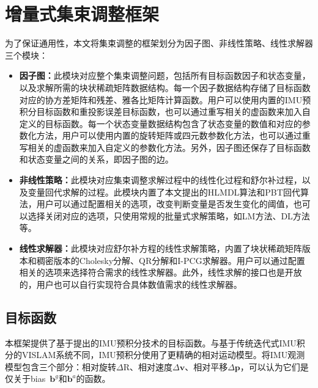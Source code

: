 \section{增量式集束调整框架}\label{sec:framework}

为了保证通用性，本文将集束调整的框架划分为因子图、非线性策略、线性求解器三个模块：
\begin{itemize}
    \item \textbf{因子图：}此模块对应整个集束调整问题，包括所有目标函数因子和状态变量，以及求解所需的块状稀疏矩阵数据结构。每一个因子数据结构存储了目标函数对应的协方差矩阵和残差、雅各比矩阵计算函数。用户可以使用内置的IMU预积分目标函数和重投影误差目标函数，也可以通过重写相关的虚函数来加入自定义的目标函数。每一个状态变量数据结构包含了状态变量的数值和对应的参数化方法，用户可以使用内置的旋转矩阵或四元数参数化方法，也可以通过重写相关的虚函数来加入自定义的参数化方法。另外，因子图还保存了目标函数和状态变量之间的关系，即因子图的边。
    \item \textbf{非线性策略：}此模块对应集束调整求解过程中的线性化过程和舒尔补过程，以及变量回代求解的过程。此模块内置了本文提出的HLMDL算法和PBT回代算法，用户可以通过配置相关的选项，改变判断变量是否发生变化的阈值，也可以选择关闭对应的选项，只使用常规的批量式求解策略，如LM方法、DL方法等。
    \item \textbf{线性求解器：}此模块对应舒尔补方程的线性求解策略，内置了块状稀疏矩阵版本和稠密版本的Cholesky分解、QR分解和I-PCG求解器。用户可以通过配置相关的选项来选择符合需求的线性求解器。此外，线性求解的接口也是开放的，用户也可以自行实现符合具体数值需求的线性求解器。
\end{itemize}

\subsection{目标函数}

本框架提供了基于提出的IMU预积分技术的目标函数。与基于传统迭代式IMU积分的VISLAM系统不同，IMU预积分使用了更精确的相对运动模型。将IMU观测模型包含三个部分：相对旋转$\Delta\mathrm{R}$、相对速度$\Delta\bm{v}$、相对平移$\Delta\bm{p}$，可以认为它们是仅关于bias~$\bm{b}^g$和$\bm{b}^a$的函数。

